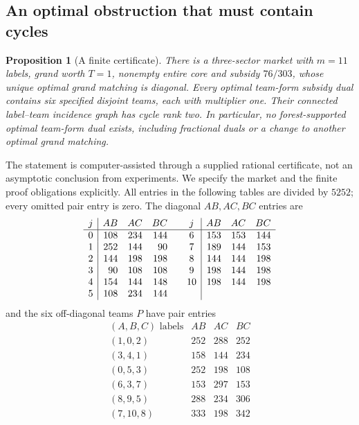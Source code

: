 \documentclass[11pt]{article}
\newtheorem{proposition}[theorem]{Proposition}
\theoremstyle{remark}
\begin{document}
\subsection{An optimal obstruction that must contain cycles}
\begin{proposition}[A finite certificate]\label{anc:cycles}
There is a three-sector market with $m=11$ labels, grand worth $T=1$,
nonempty entire core and subsidy $76/303$, whose unique optimal grand
matching is diagonal. Every optimal team-form subsidy dual contains six
specified disjoint teams, each with multiplier one. Their connected
label--team incidence graph has cycle rank two. In particular, no
forest-supported optimal team-form dual exists, including fractional
duals or a change to another optimal grand matching.
\end{proposition}
The statement is computer-assisted through a supplied rational
certificate, not an asymptotic conclusion from experiments. We specify
the market and the finite proof obligations explicitly. All entries in
the following tables are divided by $5252$; every omitted pair entry
is zero. The diagonal $AB,AC,BC$ entries are
\[
\begin{array}{c|rrr@{\qquad}c|rrr}
 j&AB&AC&BC&j&AB&AC&BC\\\hline
 0&108&234&144&6&153&153&144\\
 1&252&144&90 &7&189&144&153\\
 2&144&198&198&8&144&144&198\\
 3&90&108&108 &9&198&144&198\\
 4&154&144&148&10&198&144&198\\
 5&108&234&144&&&&
\end{array}
\]
and the six off-diagonal teams $P$ have pair entries
\[
\begin{array}{c|rrr}
 (A,B,C)\text{ labels}&AB&AC&BC\\\hline
 (1,0,2)&252&288&252\\
 (3,4,1)&158&144&234\\
 (0,5,3)&252&198&108\\
 (6,3,7)&153&297&153\\
 (8,9,5)&288&234&306\\
 (7,10,8)&333&198&342
\end{array}
\]
\end{document}
